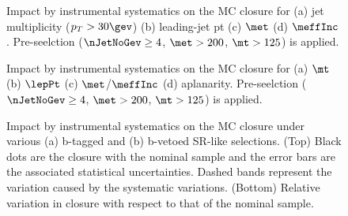 \begin{figure}[h]
  \centering
  \caption{ Impact by instrumental systematics on the MC closure for (a) jet multiplicity ($p_T>30\gev$) (b) leading-jet pt  (c) $\met$  (d) $\meffInc$. Pre-seelction ($\nJetNoGev \geq 4$, $\met>200$, $\mt>125$) is applied.  \label{fig::Uncertainties::objRepSys_kineVar1} }
\end{figure}
%
\begin{figure}[h]
  \centering
  \caption{ Impact by instrumental systematics on the MC closure for (a) $\mt$ (b) $\lepPt$  (c) $\met$/$\meffInc$  (d) aplanarity. Pre-seelction ($\nJetNoGev \geq 4$, $\met>200$, $\mt>125$) is applied.  \label{fig::Uncertainties::objRepSys_kineVar2} }
\end{figure}
%
%
\begin{figure}[h]
  \centering
  \caption{ Impact by instrumental systematics on the MC closure under various (a) b-tagged and (b) b-vetoed SR-like selections. (Top) Black dots are the closure with the nominal sample and the error bars are the associated statistical uncertainties. Dashed bands represent the variation caused by the systematic variations. (Bottom) Relative variation in closure with respect to that of the nominal sample.  \label{fig::Uncertainties::objRepSys_regionYields} }
\end{figure}
%











